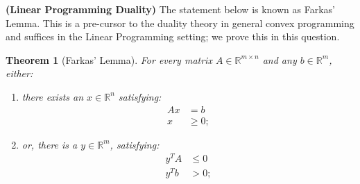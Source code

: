 \documentclass[solution,addpoints,12pt]{exam}
\newtheorem{theorem}{Theorem}
\newcommand{\reals}{\mathbb{R}}
\begin{document}
\begin{questions}

\question[25] \textbf{(Linear Programming Duality)} The statement below is known as Farkas' Lemma.  This is a pre-cursor to the duality theory in general convex programming and suffices in the Linear Programming setting; we prove this in this question.

\begin{theorem}[Farkas' Lemma]  For every matrix $A \in \reals^{m \times n}$ and any $b \in \reals^m$, either:

\begin{enumerate}
\item there exists an $x \in \reals^n$ satisfying:
  \begin{equation}
  \begin{aligned}
  Ax &= b\\
  x &\ge 0;
  \end{aligned}
  \end{equation}
\item or, there is a $y \in \reals^m$, satisfying:
  \begin{equation}
  \begin{aligned}
  y^T A &\le 0\\
  y^T b &> 0;
  \end{aligned}
  \end{equation}
\end{enumerate}
\end{theorem}



\end{questions}
\end{document}
